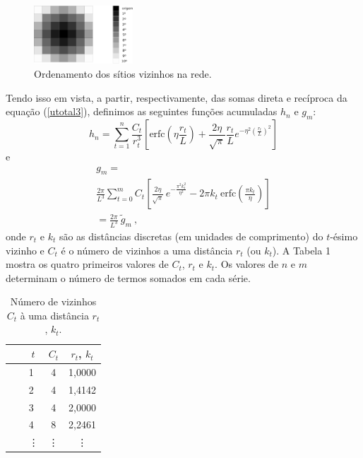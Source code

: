\documentclass[twocolumn,a4,11pt]{article}
\begin{document}
\begin{figure}[!ht]
\begin{center}
\includegraphics[width=0.33\textwidth]{vizinhos}
\end{center}
\renewcommand{\figurename}{Figura}
\caption{ {\small Ordenamento dos sítios vizinhos na rede.}}
\label{vizinho_fig}
\end{figure}

Tendo isso em vista, a partir, respectivamente, das somas direta e recíproca da equação (\ref{utotal3}), definimos as seguintes funções acumuladas $h_{n}$ e $g_{m}$:
\begin{equation}
h_{n}=\sum_{t=1}^{n} \frac{C_{t}}{r_{t}^{3}} \left[ \text{erfc} \left( \eta \frac{r_{t}}{L} \right) + \frac{2 \eta}{\sqrt{\pi}} \frac{r_{t}}{L} e^{-\eta^{2} \left( \frac{r_{t}}{L}\right)^{2}} \right]
\nonumber
\end{equation}
e
\begin{eqnarray*}
g_{m}= ~~~~~~~~~~~~~~~~~~~~~~~~~~~~~~~~~~~~~~~~~~~~~~~~~~~~
\\ \frac{2 \pi}{L^{3}} \sum_{t=0}^{m} C_{t} \left[ \frac{2 \eta}{\sqrt{\pi}} \,   e^{-\frac{\pi^{2} k_{t}^{2}}{\eta^{2}}} - 2 \pi k_{t} ~ \text{erfc} \left( \frac{\pi k_{t}}{\eta} \right) \right]
\\= \frac{2 \pi}{L^{3}} ~ \tilde{g}_{m} ~ ,
~~~~~~~~~~~~~~~~~~~~~~~~~~~~~~~~~~~~~~~~~~~~
\end{eqnarray*}
onde $r_{t}$ e $k_{t}$ são as distâncias discretas (em unidades de comprimento) do $t$-ésimo vizinho e $C_{t}$ é o número de vizinhos a uma distância $r_{t}$ (ou $k_{t}$). A Tabela 1 mostra os quatro primeiros valores de $C_{t}$, $r_{t}$ e $k_{t}$.
Os valores de $n$ e $m$ determinam o número de termos somados em cada série.

\begin{table}[h]
\begin{center}
\begin{tabular}{l c c} \hline
~~~ $t$ & $C_{t}$ & $r_{t}$, $k_{t}$\\
\hline
~~~ 1 & 4 & 1,0000\\
~~~ 2 & 4 & 1,4142\\
~~~ 3 & 4 & 2,0000\\
~~~ 4 & 8 & 2,2461\\
~~~ \vdots & \vdots & \vdots\\
\hline
\end{tabular}
\caption{ {\small Número de vizinhos $C_{t}$ à uma distância $r_{t}$, $k_{t}$.}}
\end{center}
\label{tabela_dos_vizinhos}
\end{table}
\vspace*{-0.6cm}
\end{document}
